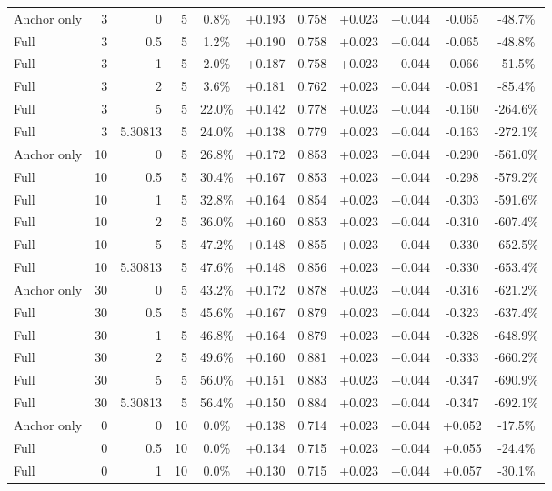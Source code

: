 \begin{table}[htbp]
\begin{tabular}{lrrrccccccc}
Anchor only & 3 & 0 & 5 & 0.8\% & +0.193 & 0.758 & +0.023 & +0.044 & -0.065 & -48.7\% \\
Full & 3 & 0.5 & 5 & 1.2\% & +0.190 & 0.758 & +0.023 & +0.044 & -0.065 & -48.8\% \\
Full & 3 & 1 & 5 & 2.0\% & +0.187 & 0.758 & +0.023 & +0.044 & -0.066 & -51.5\% \\
Full & 3 & 2 & 5 & 3.6\% & +0.181 & 0.762 & +0.023 & +0.044 & -0.081 & -85.4\% \\
Full & 3 & 5 & 5 & 22.0\% & +0.142 & 0.778 & +0.023 & +0.044 & -0.160 & -264.6\% \\
Full & 3 & 5.30813 & 5 & 24.0\% & +0.138 & 0.779 & +0.023 & +0.044 & -0.163 & -272.1\% \\
Anchor only & 10 & 0 & 5 & 26.8\% & +0.172 & 0.853 & +0.023 & +0.044 & -0.290 & -561.0\% \\
Full & 10 & 0.5 & 5 & 30.4\% & +0.167 & 0.853 & +0.023 & +0.044 & -0.298 & -579.2\% \\
Full & 10 & 1 & 5 & 32.8\% & +0.164 & 0.854 & +0.023 & +0.044 & -0.303 & -591.6\% \\
Full & 10 & 2 & 5 & 36.0\% & +0.160 & 0.853 & +0.023 & +0.044 & -0.310 & -607.4\% \\
Full & 10 & 5 & 5 & 47.2\% & +0.148 & 0.855 & +0.023 & +0.044 & -0.330 & -652.5\% \\
Full & 10 & 5.30813 & 5 & 47.6\% & +0.148 & 0.856 & +0.023 & +0.044 & -0.330 & -653.4\% \\
Anchor only & 30 & 0 & 5 & 43.2\% & +0.172 & 0.878 & +0.023 & +0.044 & -0.316 & -621.2\% \\
Full & 30 & 0.5 & 5 & 45.6\% & +0.167 & 0.879 & +0.023 & +0.044 & -0.323 & -637.4\% \\
Full & 30 & 1 & 5 & 46.8\% & +0.164 & 0.879 & +0.023 & +0.044 & -0.328 & -648.9\% \\
Full & 30 & 2 & 5 & 49.6\% & +0.160 & 0.881 & +0.023 & +0.044 & -0.333 & -660.2\% \\
Full & 30 & 5 & 5 & 56.0\% & +0.151 & 0.883 & +0.023 & +0.044 & -0.347 & -690.9\% \\
Full & 30 & 5.30813 & 5 & 56.4\% & +0.150 & 0.884 & +0.023 & +0.044 & -0.347 & -692.1\% \\
Anchor only & 0 & 0 & 10 & 0.0\% & +0.138 & 0.714 & +0.023 & +0.044 & +0.052 & -17.5\% \\
Full & 0 & 0.5 & 10 & 0.0\% & +0.134 & 0.715 & +0.023 & +0.044 & +0.055 & -24.4\% \\
Full & 0 & 1 & 10 & 0.0\% & +0.130 & 0.715 & +0.023 & +0.044 & +0.057 & -30.1\% \\

\end{tabular}
\end{table}
